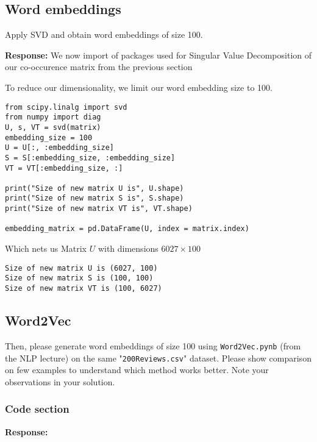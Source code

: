 \documentclass[12pt, letterpaper]{article}
\newcommand{\mybox}[1]{\par\noindent\colorbox{shadecolor}
{\parbox{\dimexpr\textwidth-2\fboxsep\relax}{#1}}}
\begin{document}
\subsection{Word embeddings}
\mybox{Apply SVD and obtain word embeddings of size 100.}

\textbf{Response:} We now import of packages used for Singular Value Decomposition of our co-occurence matrix from the previous section

To reduce our dimensionality, we limit our word embedding size to 100.

\begin{mdframed}[backgroundcolor=shadecolor]
\begin{verbatim}
from scipy.linalg import svd
from numpy import diag
U, s, VT = svd(matrix)
embedding_size = 100
U = U[:, :embedding_size]
S = S[:embedding_size, :embedding_size]
VT = VT[:embedding_size, :]

print("Size of new matrix U is", U.shape)
print("Size of new matrix S is", S.shape)
print("Size of new matrix VT is", VT.shape)

embedding_matrix = pd.DataFrame(U, index = matrix.index)
\end{verbatim}
\end{mdframed}

Which nets us Matrix $U$ with dimensions $6027\times 100$

\begin{lstlisting}
Size of new matrix U is (6027, 100)
Size of new matrix S is (100, 100)
Size of new matrix VT is (100, 6027)
\end{lstlisting}

\subsection{Word2Vec}

\mybox{Then, please generate word embeddings of size 100 using \texttt{Word2Vec.pynb} (from the NLP lecture) on the same "\texttt{200Reviews.csv}" dataset. 
Please show comparison on few examples to understand which method works better. Note your observations in your solution.}

\subsubsection{Code section}

\textbf{Response:}
\end{document}
